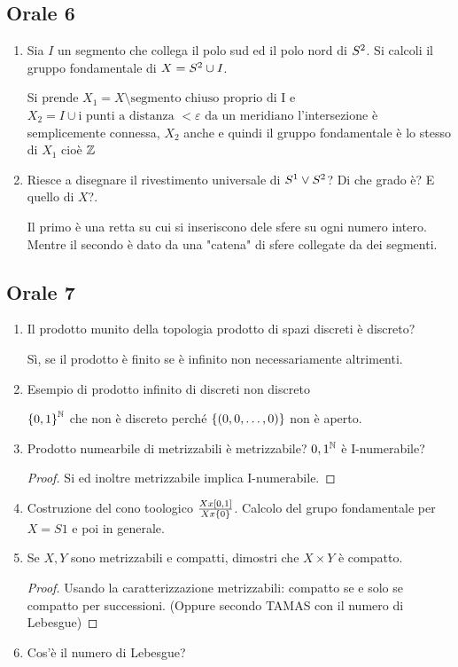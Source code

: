 \documentclass[]{article}
\begin{document}
\subsection{Orale 6}
\begin{enumerate}
    \item Sia $I$ un segmento che collega il polo sud ed il polo nord di $S^{2}$. \nl
    Si calcoli il gruppo fondamentale di $X = S^{2} \cup I$.
    \begin{answer}
        Si prende $X_1 = X \setminus \text{segmento chiuso proprio di I}$ e $X_2 = I \cup \text{i punti a distanza } < \varepsilon \text{ da un meridiano}$
        l'intersezione \`e semplicemente connessa, $X_2$ anche e quindi il gruppo fondamentale \`e lo stesso di $X_1$ cio\`e $\mathbb{Z}$
    \end{answer}
    \item Riesce a disegnare il rivestimento universale di $S^{1} \vee S^{2}$? Di che grado \`e? E quello di $X$?.
    \begin{answer}
        Il primo \`e una retta su cui si inseriscono dele sfere su ogni numero intero. \nl
        Mentre il secondo \`e dato da una "catena" di sfere collegate da dei segmenti.
    \end{answer}
\end{enumerate}

\subsection{Orale 7}
\begin{enumerate}
    \item Il prodotto munito della topologia prodotto di spazi discreti \`e discreto?
    \begin{answer}
        S\`i, se il prodotto \`e finito se \`e infinito non necessariamente altrimenti.
    \end{answer}
    \item Esempio di prodotto infinito di discreti non discreto
    \begin{answer}
        $\left\{ 0,1 \right\}^{\mathbb{N}}$ che non \`e discreto perch\'e $\left\{ (0,0,\dots,0) \right\}$ non \`e aperto.
    \end{answer}
    \item Prodotto numearbile di metrizzabili \`e metrizzabile? ${0,1}^{\mathbb{N}}$ \`e I-numerabile?
    \begin{proof}
        Si ed inoltre metrizzabile implica I-numerabile.
    \end{proof}
    \item Costruzione del cono toologico $\frac{X x [0,1]}{X x \left\{ 0 \right\}}$. Calcolo del grupo fondamentale per
    $X = S1$ e poi in generale. 
    \item Se $X,Y$ sono metrizzabili e compatti, dimostri che $X \times Y$ \`e compatto.
    \begin{proof}
        Usando la caratterizzazione metrizzabili: compatto se e solo se compatto per successioni.
        (Oppure secondo TAMAS con il numero di Lebesgue)
        \nl
    \end{proof}
    \item Cos'\`e il numero di Lebesgue?
\end{enumerate}
\end{document}
